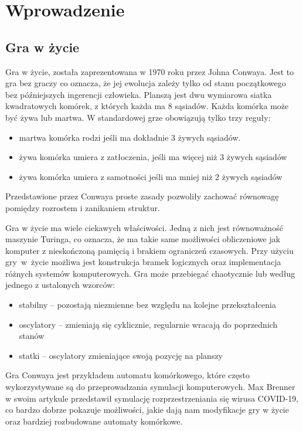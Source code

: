 \documentclass[declaration,shortabstract, inz]{iithesis}
\author         {Marcin Rogala}
\date          {25 grudnia 2020}
\theoremstyle{definition} \newtheorem{definition}{Definicja}[]
\theoremstyle{plain} \newtheorem{remark}[definition]{Obserwacja}
\theoremstyle{plain} \newtheorem{theorem}[definition]{Twierdzenie}
\theoremstyle{plain} \newtheorem{example}{Przykład}[definition]
\theoremstyle{plain} \newtheorem{lemma}[definition]{Lemat}
\begin{document}
\chapter{Wprowadzenie}
\section{Gra w życie}
Gra w życie, została zaprezentowana w 1970 roku przez Johna Conwaya.  Jest to gra bez graczy co oznacza, że jej ewolucja zależy tylko od stanu początkowego bez późniejszych ingerencji człowieka. Planszą jest dwu wymiarowa siatka kwadratowych komórek, z których każda ma 8 sąsiadów. Każda komórka może być żywa lub martwa. W standardowej grze obowiązują tylko trzy reguły:

\begin{itemize}
\item martwa komórka rodzi jeśli ma dokładnie 3 żywych sąsiadów.
\item żywa komórka umiera z zatłoczenia, jeśli ma więcej niż 3 żywych sąsiadów
\item żywa komórka umiera z samotności jeśli ma mniej niż 2 żywych sąsiadów
\end{itemize}

Przedstawione przez Conwaya proste zasady pozwoliły zachować równowagę pomiędzy rozrostem i zanikaniem struktur.

Gra w życie ma wiele ciekawych właściwości. Jedną z nich jest równoważność maszynie Turinga, co oznacza, że ma takie same możliwości obliczeniowe jak komputer z nieskończoną pamięcią i brakiem ograniczeń czasowych. Przy użyciu gry~w~życie możliwa jest konstrukcja bramek logicznych oraz implementacja różnych systemów komputerowych. Gra może przebiegać chaotycznie lub według jednego z ustalonych wzorców: 
\begin{itemize}
	\item stabilny -- pozostają niezmienne bez względu na kolejne przekształcenia
	\item oscylatory -- zmieniają się cyklicznie, regularnie wracają do poprzednich stanów
	\item statki -- oscylatory zmieniające swoją pozycję na planszy
\end{itemize}

Gra Conwaya jest przykładem automatu komórkowego, które często wykorzystywane są do przeprowadzania symulacji komputerowych. 
Max Brenner w swoim artykule \cite{brenner} przedstawił symulację rozprzestrzeniania się wirusa COVID-19, co bardzo dobrze pokazuje możliwości, jakie dają nam modyfikacje gry w życie oraz bardziej rozbudowane automaty komórkowe.
\end{document}
